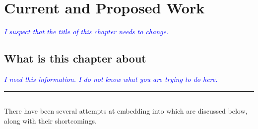 \documentclass[thesis-solanki.tex]{subfiles}
\begin{document}
\chapter{Current and Proposed Work}\label{chap:proposedWork}

\textcolor{blue}{\textsl{I suspect that the title of this chapter needs to change.}}

\section{What is this chapter about}

\textcolor{blue}{\textsl{I need this information.
    I do not know what you are trying to do here.
}}

\noindent\rule{\textwidth}{0.5pt}


\section{}

There have been several attempts at embedding  into  which are
discussed below{\large,} along with their shortcomings.
\end{document}
